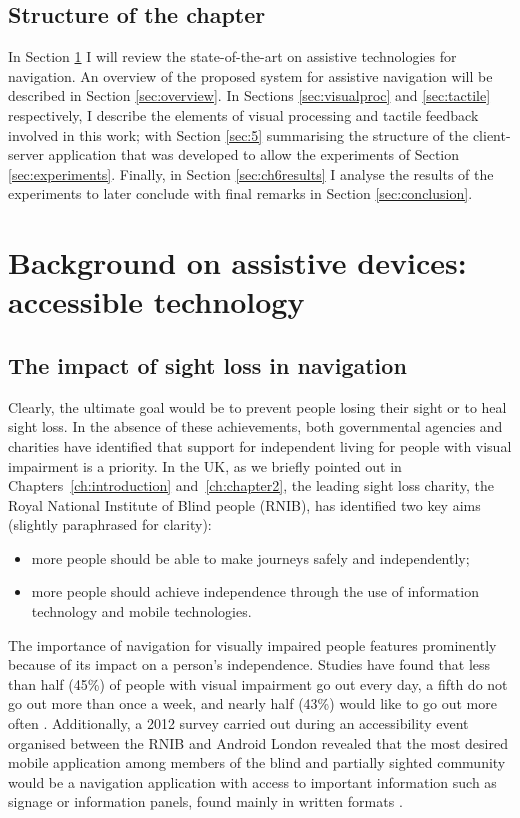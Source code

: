 \subsection{Structure of the chapter}

In Section \ref{sec:2} I will review the state-of-the-art on assistive technologies for navigation. An overview of the proposed system for assistive navigation will be described in Section \ref{sec:overview}. In Sections \ref{sec:visualproc} and \ref{sec:tactile} respectively, I describe the elements of visual processing and tactile feedback involved in this work; with Section \ref{sec:5} summarising the structure of the client-server application that was developed to allow the experiments of Section \ref{sec:experiments}. Finally, in Section \ref{sec:ch6results} I analyse the results of the experiments to later conclude with final remarks in Section \ref{sec:conclusion}.

\section{Background on assistive devices: accessible technology}
\label{sec:2}

\subsection{The impact of sight loss in navigation}

Clearly, the ultimate goal would be to prevent people losing their sight or to heal sight loss. In the absence of these achievements, both governmental agencies and charities have identified that support for independent living for people with visual impairment is a priority. In the UK, as we briefly pointed out in Chapters~\ref{ch:introduction} and~\ref{ch:chapter2}, the leading sight loss charity, the Royal National Institute of Blind people (RNIB), has identified two key aims \citep{RNIB2009} (slightly paraphrased for clarity): 
\begin{itemize}
\item more people should be able to make journeys safely and independently; 
\item more people should achieve independence through the use of information technology and mobile technologies.
\end{itemize}

The importance of navigation for visually impaired people features prominently because of its impact on a person's independence. Studies have found that less than half (45\%) of people with visual impairment go out every day, a fifth do not go out more than once a week, and nearly half (43\%) would like to go out more often \citep{douglas2006network, RNIB2009}.   Additionally, a 2012 survey carried out during an accessibility event organised between the RNIB and Android London revealed that the most desired mobile application among members of the blind and partially sighted community would be a navigation application with access to important information such as signage or information panels, found mainly in written formats \citep{RNIB2012}. 

